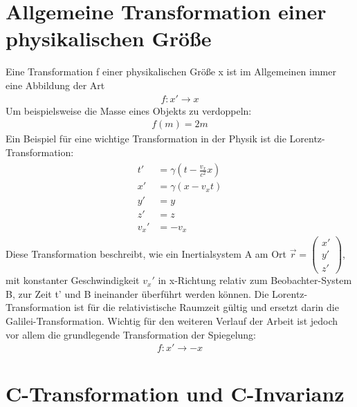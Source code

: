 \documentclass[12pt,a4paper]{scrartcl}
\numberwithin{equation}{section}
\begin{document}
  \newpage  %

  \section{Allgemeine Transformation einer physikalischen Größe}

Eine Transformation f einer physikalischen Größe x ist im Allgemeinen immer eine Abbildung der Art
\begin{align}
    f: x' \to x
\end{align}
Um beispielsweise die Masse eines Objekts zu verdoppeln:
\begin{align}
    f(m) = 2m
\end{align}
Ein Beispiel für eine wichtige Transformation in der Physik ist die Lorentz-Transformation:
\begin{align}
  \begin{split}
    t' &= \gamma(t - \frac{v_x}{c^2}x) \\ x' &= \gamma(x -v_x t) \\ y' &= y \\ z' &= z \\ v_x' &= -v_x
  \end{split}
\end{align}
Diese Transformation beschreibt, wie ein Inertialsystem A am Ort $ \vec{r} = \begin{pmatrix}x'\\y'\\z'\end{pmatrix} $, mit konstanter Geschwindigkeit $v_x'$ in x-Richtung relativ zum Beobachter-System B, zur Zeit t' und B ineinander überführt werden können. Die Lorentz-Transformation ist für die relativistische Raumzeit gültig und ersetzt darin die Galilei-Transformation.
Wichtig für den weiteren Verlauf der Arbeit ist jedoch vor allem die grundlegende Transformation der Spiegelung:
\begin{align}
    f: x' \to - x
\end{align}

  \newpage  %

  \section{C-Transformation und C-Invarianz}
\end{document}
